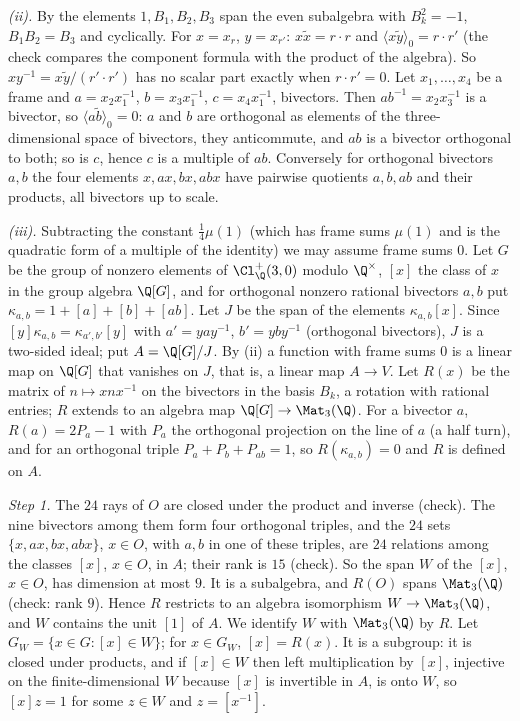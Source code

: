 \emph{(ii).} By  the elements $1, B_{1}, B_{2}, B_{3}$ span the even subalgebra with $B_{k}^{2} = -1$, $B_{1}B_{2} = B_{3}$ and cyclically. For $x = x_{r}$, $y = x_{r'}$: $x\tilde{x} = r \cdot r$ and $\langle x\tilde{y}\rangle_{0} = r \cdot r'$ (the check compares the component formula with the product of the algebra). So $xy^{-1} = x\tilde{y}/(r' \cdot r')$ has no scalar part exactly when $r \cdot r' = 0$. Let $x_{1}, \dots, x_{4}$ be a frame and $a = x_{2}x_{1}^{-1}$, $b = x_{3}x_{1}^{-1}$, $c = x_{4}x_{1}^{-1}$, bivectors. Then $ab^{-1} = x_{2}x_{3}^{-1}$ is a bivector, so $\langle a\tilde{b}\rangle_{0} = 0$: $a$ and $b$ are orthogonal as elements of the three-dimensional space of bivectors, they anticommute, and $ab$ is a bivector orthogonal to both; so is $c$, hence $c$ is a multiple of $ab$. Conversely for orthogonal bivectors $a, b$ the four elements $x, ax, bx, abx$ have pairwise quotients $a, b, ab$ and their products, all bivectors up to scale.

\emph{(iii).} Subtracting the constant $\tfrac14\mu(1)$ (which has frame sums $\mu(1)$ and is the quadratic form of a multiple of the identity) we may assume frame sums $0$. Let $G$ be the group of nonzero elements of $\Cl_{\Q}^{+}(3,0)$ modulo $\Q^{\times}$, $[x]$ the class of $x$ in the group algebra $\Q[G]$, and for orthogonal nonzero rational bivectors $a, b$ put $\kappa_{a,b} = 1 + [a] + [b] + [ab]$. Let $J$ be the span of the elements $\kappa_{a,b}[x]$. Since $[y]\kappa_{a,b} = \kappa_{a',b'}[y]$ with $a' = yay^{-1}$, $b' = yby^{-1}$ (orthogonal bivectors), $J$ is a two-sided ideal; put $A = \Q[G]/J$. By (ii) a function with frame sums $0$ is a linear map on $\Q[G]$ that vanishes on $J$, that is, a linear map $A \to V$. Let $R(x)$ be the matrix of $n \mapsto xnx^{-1}$ on the bivectors in the basis $B_{k}$, a rotation with rational entries; $R$ extends to an algebra map $\Q[G] \to \Mat_{3}(\Q)$. For a bivector $a$, $R(a) = 2P_{a} - 1$ with $P_{a}$ the orthogonal projection on the line of $a$ (a half turn), and for an orthogonal triple $P_{a} + P_{b} + P_{ab} = 1$, so $R(\kappa_{a,b}) = 0$ and $R$ is defined on $A$.

\emph{Step 1.} The $24$ rays of $O$ are closed under the product and inverse (check). The nine bivectors among them form four orthogonal triples, and the $24$ sets $\{x, ax, bx, abx\}$, $x \in O$, with $a, b$ in one of these triples, are $24$ relations among the classes $[x]$, $x \in O$, in $A$; their rank is $15$ (check). So the span $W$ of the $[x]$, $x \in O$, has dimension at most $9$. It is a subalgebra, and $R(O)$ spans $\Mat_{3}(\Q)$ (check: rank $9$). Hence $R$ restricts to an algebra isomorphism $W \to \Mat_{3}(\Q)$, and $W$ contains the unit $[1]$ of $A$. We identify $W$ with $\Mat_{3}(\Q)$ by $R$. Let $G_{W} = \{x \in G : [x] \in W\}$; for $x \in G_{W}$, $[x] = R(x)$. It is a subgroup: it is closed under products, and if $[x] \in W$ then left multiplication by $[x]$, injective on the finite-dimensional $W$ because $[x]$ is invertible in $A$, is onto $W$, so $[x]z = 1$ for some $z \in W$ and $z = [x^{-1}]$.

